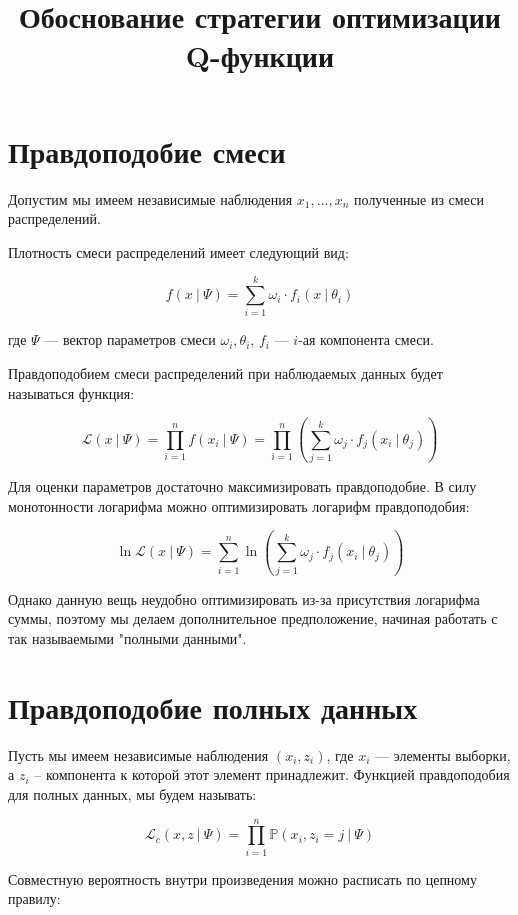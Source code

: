 \documentclass[14pt, a4paper, oneside]{memoir}
\title{Обоснование стратегии оптимизации Q-функции}
\begin{document}
\begin{titlingpage}
	\maketitle
\end{titlingpage}

\section{Правдоподобие смеси}

Допустим мы имеем независимые наблюдения $x_1, \dots, x_n$ полученные из смеси распределений.

Плотность смеси распределений имеет следующий вид:

\[f(x ~|~ \Psi) = \sum_{i=1}^k \omega_i \cdot f_i (x~|~\theta_i)\]

где $\Psi$ --- вектор параметров смеси $\omega_i, \theta_i$, $f_i$ --- $i$-ая компонента смеси.

Правдоподобием смеси распределений при наблюдаемых данных будет называться функция:

\[\mathcal{L}(x ~|~ \Psi) = \prod_{i=1}^n f(x_i ~|~ \Psi) = \prod_{i=1}^n \left(\sum_{j=1}^k \omega_j \cdot f_j(x_i ~|~ \theta_j)\right)\]

Для оценки параметров достаточно максимизировать правдоподобие. В силу монотонности логарифма можно оптимизировать логарифм правдоподобия:

\[\ln \mathcal{L}(x ~|~ \Psi) = \sum_{i=1}^n \ln \left(\sum_{j=1}^k \omega_j \cdot f_j(x_i~|~ \theta_j)\right)\]


Однако данную вещь неудобно оптимизировать из-за присутствия логарифма суммы, поэтому мы делаем дополнительное предположение, начиная работать с так называемыми "полными данными".

\section{Правдоподобие полных данных}

Пусть мы имеем независимые наблюдения $(x_i, z_i)$, где $x_i$ --- элементы выборки, а $z_i$ -- компонента к которой этот элемент принадлежит.
Функцией правдоподобия для полных данных, мы будем называть:

\[\mathcal{L}_c(x, z ~|~ \Psi) = \prod_{i=1}^n \mathbb{P} (x_i, z_i = j~|~ \Psi)\]

Совместную вероятность внутри произведения можно расписать по цепному правилу:
\end{document}
